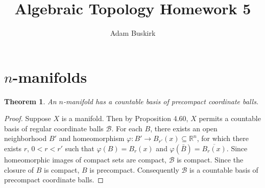 \documentclass{article}
\title{Algebraic Topology Homework 5}
\author{Adam Buskirk}
\newtheorem{theorem}[subsection]{Theorem}
\newtheorem{lemma}[subsection]{Lemma}
\theoremstyle{definition}
\newcommand{\R}{\mathbb{R}}
\newcommand{\set}[1]{\left\{#1\right\}}
\begin{document}
\maketitle

\section{$n$-manifolds}

\begin{theorem}
An $n$-manifold has a countable basis of precompact coordinate balls.
\end{theorem}
\begin{proof}
Suppose $X$ is a manifold. Then by Proposition 4.60,
$X$ permits a countable basis of regular coordinate balls $\mathcal{B}$. 
For each $B$, there exists an open neighborhood $B'$ and homeomorphism 
$\varphi : B' \to B_{r'}(x) \subseteq \R^n$, for which there exists
$r$, $0 < r < r'$ such that $\varphi(B) = B_r(x)$ and 
$\varphi(\bar{B}) = \overline{B_r(x)}$. Since homeomorphic images of
compact sets are compact, $\mathcal{B}$ is compact. Since the closure
of $B$ is compact, $B$ is precompact. Consequently $\mathcal{B}$ is
a countable basis of precompact coordinate balls.
\end{proof}
\end{document}
